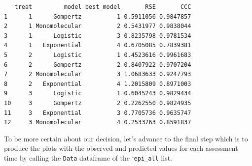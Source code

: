\documentclass[
  letterpaper,
  DIV=11,
  numbers=noendperiod]{scrreprt}
\newenvironment{Shaded}{\begin{snugshade}}{\end{snugshade}}
\newcommand{\AttributeTok}[1]{\textcolor[rgb]{0.40,0.45,0.13}{#1}}
\newcommand{\CommentTok}[1]{\textcolor[rgb]{0.37,0.37,0.37}{#1}}
\newcommand{\DecValTok}[1]{\textcolor[rgb]{0.68,0.00,0.00}{#1}}
\newcommand{\FunctionTok}[1]{\textcolor[rgb]{0.28,0.35,0.67}{#1}}
\newcommand{\NormalTok}[1]{\textcolor[rgb]{0.00,0.23,0.31}{#1}}
\newcommand{\SpecialCharTok}[1]{\textcolor[rgb]{0.37,0.37,0.37}{#1}}
\newcommand{\StringTok}[1]{\textcolor[rgb]{0.13,0.47,0.30}{#1}}
\begin{document}
\begin{verbatim}
   treat         model best_model       RSE       CCC
1      1      Gompertz          1 0.5911056 0.9847857
2      1 Monomolecular          2 0.5431977 0.9838044
3      1      Logistic          3 0.8235798 0.9781534
4      1   Exponential          4 0.6705085 0.7839381
5      2      Logistic          1 0.4523616 0.9961683
6      2      Gompertz          2 0.8407922 0.9707204
7      2 Monomolecular          3 1.0683633 0.9247793
8      2   Exponential          4 1.2015809 0.8971003
9      3      Logistic          1 0.6045243 0.9829434
10     3      Gompertz          2 0.2262550 0.9824935
11     3   Exponential          3 0.7705736 0.9635747
12     3 Monomolecular          4 0.2533763 0.8591837
\end{verbatim}

To be more certain about our decision, let's advance to the final step
which is to produce the plots with the observed and predicted values for
each assessment time by calling the \texttt{Data} dataframe of the
`\texttt{epi\_all} list.

\begin{Shaded}
\end{Shaded}
\end{document}
